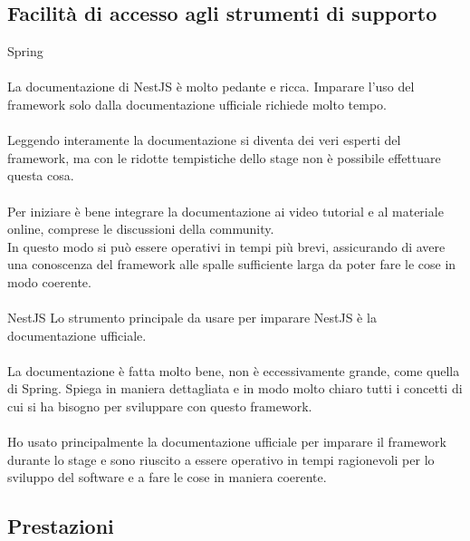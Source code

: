 \subsection{Facilità di accesso agli strumenti di supporto}
Spring 
\\\\
La documentazione di NestJS è molto pedante e ricca. Imparare l'uso del framework solo dalla documentazione 
ufficiale richiede molto tempo. 
\\\\
Leggendo interamente la documentazione si diventa dei veri esperti del framework, ma con le ridotte tempistiche
dello stage non è possibile effettuare questa cosa.
\\\\
Per iniziare è bene integrare la documentazione ai video tutorial e al materiale online, comprese le discussioni 
della community. 
\\
In questo modo si può essere operativi in tempi più brevi, assicurando di avere una conoscenza
del framework alle spalle sufficiente larga da poter fare le cose in modo coerente.
\\\\
NestJS
Lo strumento principale da usare per imparare NestJS è la documentazione ufficiale.
\\\\
La documentazione è fatta molto bene, non è eccessivamente grande, come quella di Spring. Spiega in maniera dettagliata
e in modo molto chiaro tutti i concetti di cui si ha bisogno per sviluppare con questo framework.
\\\\
Ho usato principalmente la documentazione ufficiale per imparare il framework durante lo stage e sono riuscito a essere
operativo in tempi ragionevoli per lo sviluppo del software e a fare le cose in maniera coerente.

\subsection{Prestazioni}
